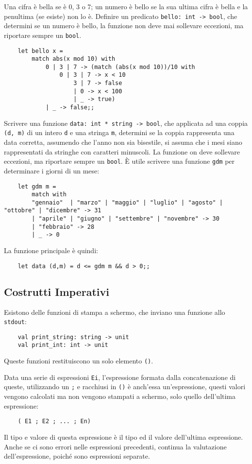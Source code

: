 \documentclass{article}
\numberwithin{equation}{subsection}
\begin{document}
Una cifra è bella se è 0, 3 o 7; un numero è bello se la sua ultima cifra è bella e la penultima (se esiste) non lo è. Definire un predicato \verb|bello: int -> bool|, che determini se un numero è bello, la funzione non deve mai sollevare eccezioni, ma riportare sempre un \verb|bool|. 
\begin{verbatim}
    let bello x = 
        match abs(x mod 10) with
            0 | 3 | 7 -> (match (abs(x mod 10))/10 with
                0 | 3 | 7 -> x < 10
                    3 | 7 -> false
                    | 0 -> x < 100
                    | _ -> true)
            | _ -> false;;
\end{verbatim}

Scrivere una funzione \verb|data: int * string -> bool|, che applicata ad una coppia \verb|(d, m)| di un intero \verb|d| e una stringa \verb|m|, determini se la coppia rappresenta una data corretta, assumendo che l'anno non sia bisestile, si assuma che i mesi siano rappresentati da stringhe con caratteri minuscoli. La funzione on deve sollevare eccezioni, ma riportare sempre un \verb|bool|. 
È utile scrivere una funzione \verb|gdm| per determinare i giorni di un mese:
\begin{verbatim}
    let gdm m = 
        match with
        "gennaio"  | "marzo" | "maggio" | "luglio" | "agosto" | "ottobre" | "dicembre" -> 31
        | "aprile" | "giugno" | "settembre" | "novembre" -> 30
        | "febbraio" -> 28
        | _ -> 0
\end{verbatim}
La funzione principale è quindi:
\begin{verbatim}
    let data (d,m) = d <= gdm m && d > 0;;
\end{verbatim}

\subsection{Costrutti Imperativi}

Esistono delle funzioni di stampa a schermo, che inviano una funzione allo \verb|stdout|:
\begin{verbatim}
    val print_string: string -> unit
    val print_int: int -> unit
\end{verbatim}
Queste funzioni restituiscono un solo elemento \verb|()|. 

Data una serie di espressioni \verb|Ei|, l'espressione formata dalla concatenazione di queste, utilizzando un \verb|;| e racchiusi in \verb|()| è anch'essa un'espressione, questi valori vengono calcolati ma non vengono stampati a schermo, solo quello dell'ultima espressione:
\begin{verbatim}
    ( E1 ; E2 ; ... ; En)
\end{verbatim}
Il tipo e valore di questa espressione è il tipo ed il valore dell'ultima espressione. Anche se ci sono errori nelle espressioni precedenti, continua la valutazione dell'espressione, poiché sono espressioni separate. 
\end{document}
